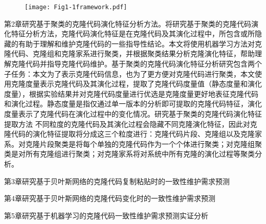 \begin{figure}[htbp]
\centering
\texttt{[image: Fig1-1framework.pdf]}
\vspace{-1em}
\end{figure}

第2章研究基于聚类的克隆代码演化特征分析方法。将研究基于聚类的克隆代码演化特征分析方法，克隆代码演化特征是在克隆代码及其演化过程中，所包含或所隐藏的有助于理解和维护克隆代码的一些指导性结论。本文将使用机器学习方法对克隆代码、克隆组和克隆家系进行聚类，并根据聚类结果分析克隆演化特征，帮助理解克隆代码并指导克隆代码维护。基于聚类的克隆代码演化特征分析研究包含两个子任务：本文为了表示克隆代码信息，也为了更方便对克隆代码进行聚类，本文使用克隆度量表示克隆代码及其演化过程，提取了克隆代码度量值（静态度量和演化度量），根据实验结果并对克隆代码度量进行优选是克隆度量更好地表征克隆代码和演化过程。静态度量是指仅通过单一版本的分析即可提取的克隆代码特征，演化度量表示了克隆代码在演化过程中的变化情况。研究基于聚类的克隆代码演化特征提取方法
不同粒度的克隆代码及其演化过程会隐藏不同克隆演化特征，因此对克隆代码的演化特征提取将分成这三个粒度进行：克隆代码片段、克隆组以及克隆家系。对克隆片段聚类是将每个单独的克隆代码作为一个个体进行聚类；对克隆组聚类是对所有克隆组进行聚类；对克隆家系将对系统中所有克隆的演化过程等聚类分析。

第3章研究基于贝叶斯网络的克隆代码复制粘贴时的一致性维护需求预测

第4章研究基于贝叶斯网络的克隆代码变化时的一致性维护需求预测

第5章研究基于机器学习的克隆代码一致性维护需求预测实证分析

